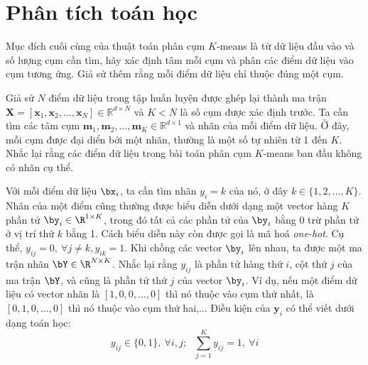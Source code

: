 


\section{Phân tích toán học }

Mục đích cuối cùng của thuật toán phân cụm $K$-means là từ dữ liệu đầu vào và số
lượng cụm cần tìm, hãy xác định tâm mỗi cụm và phân các điểm dữ liệu vào cụm
tương ứng. Giả sử thêm rằng mỗi điểm dữ liệu chỉ thuộc đúng một cụm.


Giả sử $N$ điểm dữ liệu trong tập huấn luyện được ghép lại thành ma trận $ \mathbf{X} =
[\mathbf{x}_1, \mathbf{x}_2, \dots,
\mathbf{x}_N] \in \mathbb{R}^{d \times N}$ và $K < N$ là số cụm được xác định trước. Ta cần tìm các tâm cụm $ \mathbf{m}_1, \mathbf{m}_2,
\dots, \mathbf{m}_K \in \mathbb{R}^{d \times 1}$ và nhãn của mỗi điểm dữ liệu.
Ở đây, mỗi cụm được đại diển bởi một nhãn, thường là một số tự nhiên từ 1
đến $K$. Nhắc lại rằng các điểm dữ liệu trong bài toán phân cụm $K$-means ban
đầu không có nhãn cụ thể. 

Với mỗi điểm dữ liệu $\bx_i$, ta cần tìm nhãn $y_i = k$ của nó, ở đây $k\in
\{1, 2, \dots, K\}$. Nhãn của một điểm cũng thường được biểu diễn dưới dạng một
vector hàng $K$ phần tử $\by_i \in \R^{1\times K}$, trong đó tất cả các phần tử
của $\by_i$ bằng 0 trừ phần tử ở vị trí thứ $k$ bằng 1. Cách biểu diễn này còn
được gọi là mã hoá \textit{one-hot}. Cụ thể, $y_{ij} = 0,~\forall j \neq k,
y_{ik} = 1$. Khi {chồng} các vector $\by_i$ lên nhau, ta được một ma trận nhãn
$\bY \in \R^{N\times K}$. Nhắc lại rằng $y_{ij}$ là phần tử hàng thứ $i$, cột
thứ $j$ của ma trận $\bY$, và cũng là phần tử thứ $j$ của vector $\by_i$. Ví dụ,
nếu một điểm dữ liệu có vector nhãn là $[1,0,0,\dots,0]$ thì nó thuộc vào cụm
thứ nhất, là $[0,1,0,\dots,0]$ thì nó thuộc vào cụm thứ hai,... Điều kiện của
$\mathbf{y}_i $ có thể viết dưới dạng toán học:
\begin{equation}
\label{eqn:4_1} y_{ij} \in \{0, 1\},~\forall i, j;~~~ \sum_{j = 1}^K y_{ij} = 1, ~\forall i
\end{equation}
